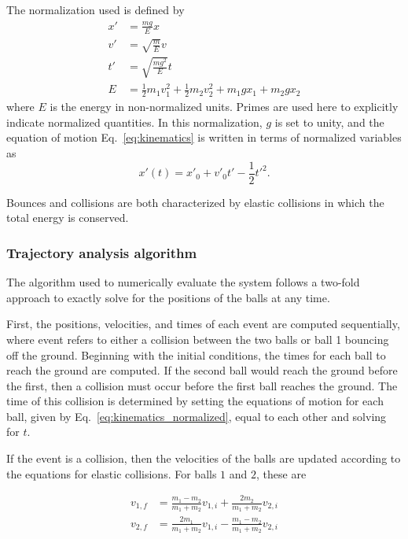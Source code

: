 \documentclass[pra,twocolumn,showpacs,amsmath,amssymb, aps, 10pt]{revtex4-1}
\begin{document}
The normalization used is defined by
\begin{align}
x' &= \frac{mg}{E} x \\
v' &= \sqrt{\frac{m}{E}} v \\
t' &= \sqrt{\frac{mg^2}{E}} t \\
E &= \frac{1}{2} m_1 v_1^2 + \frac{1}{2} m_2 v_2^2 + m_1 g x_1 + m_2 g x_2
\label{eq:normalization}
\end{align}
where $E$ is the energy in non-normalized units.
Primes are used here to explicitly indicate normalized quantities.
In this normalization, $g$ is set to unity, and the equation of motion
Eq.~\ref{eq:kinematics} is written in terms of normalized variables as
\begin{equation}
x'(t) = x'_0 + v'_0 t' - \frac{1}{2} t'^2.
\label{eq:kinematics_normalized}
\end{equation}

Bounces and collisions are both characterized by elastic collisions in which
the total energy is conserved.

\subsubsection{Trajectory analysis algorithm}

The algorithm used to numerically evaluate the system follows a two-fold approach
to exactly solve for the positions of the balls at any time.

First, the positions, velocities, and times of each event are
computed sequentially, where event refers to either a collision between the two
balls or ball 1 bouncing off the ground.
Beginning with the initial conditions, the times for each
ball to reach the ground are computed. If the second ball would reach the ground
before the first, then a collision must occur before the first ball reaches the
ground. The time of this collision is determined by setting the equations of
motion for each ball, given by Eq.~\ref{eq:kinematics_normalized}, equal to each
other and solving for $t$.

If the event is a collision, then the velocities of the balls are updated according
to the equations for elastic collisions. For balls $1$ and $2$, these are

\begin{align}
  v_{1,f} &= \frac{m_1-m_2}{m_1+m_2}v_{1,i} + \frac{2 m_2}{m_1+m_2}v_{2,i} \\
  v_{2,f} &= \frac{2 m_1}{m_1+m_2}v_{1,i} - \frac{m_1-m_2}{m_1+m_2}v_{2,i}
\end{align}
\end{document}
